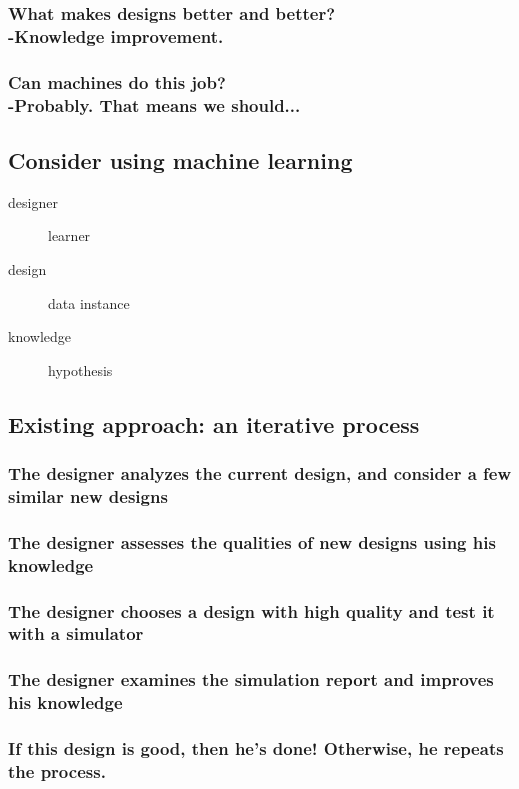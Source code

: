 \documentclass[12pt]{article}
\theoremstyle{definition}
\begin{document}
\subsubsection{What makes designs better and better? \\ -Knowledge improvement.}
\subsubsection{Can machines do this job? \\ -Probably. That means we should...}
\pagebreak

\subsection{Consider using machine learning}
\begin{description}
  \item[designer] learner
  \item[design] data instance
  \item[knowledge] hypothesis
\end{description}
\pagebreak

\subsection{Existing approach: an iterative process}
\subsubsection{The designer analyzes the current design, and consider a few similar new designs}
\subsubsection{The designer assesses the qualities of new designs using his knowledge}
\subsubsection{The designer chooses a design with high quality and test it with a simulator}
\subsubsection{The designer examines the simulation report and improves his knowledge}
\subsubsection{If this design is good, then he's done! Otherwise, he repeats the process.}
\pagebreak
\end{document}
